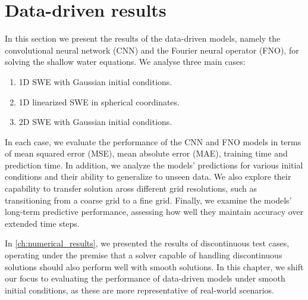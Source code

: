 \chapter{Data-driven results}\label{ch:data-driven-results}
In this section we present the results of the data-driven models, namely the convolutional neural network (CNN) and the Fourier neural operator (FNO), for solving the shallow water equations.
We analyse three main cases:
\begin{enumerate}
    \item 1D SWE with Gaussian initial conditions. 
    \item 1D linearized SWE in spherical coordinates.
    \item 2D SWE with Gaussian initial conditions.
\end{enumerate}
In each case, we evaluate the performance of the CNN and FNO models in terms of mean squared error (MSE), mean absolute error (MAE), training time and prediction time.
In addition, we analyze the models' predictions for various initial conditions and their ability to generalize to unseen data.
We also explore their capability to transfer solution aross different grid resolutions, such as transitioning from a coarse grid to a fine grid.
Finally, we examine the models' long-term predictive performance, assessing how well they maintain accuracy over extended time steps.

In \autoref{ch:numerical_results}, we presented the results of discontinuous test cases, operating under the premise that a solver capable of handling discontinuous solutions should also perform well with smooth solutions.
In this chapter, we shift our focus to evaluating the performance of data-driven models under smooth initial conditions, as these are more representative of real-world scenarios.

